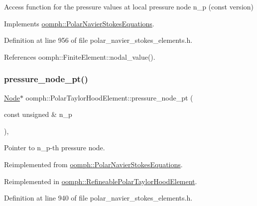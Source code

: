 Access function for the pressure values at local pressure node n\+\_\+p (const version) 



Implements \hyperlink{classoomph_1_1PolarNavierStokesEquations_a4db8f8149fe830b204de3c5f64fd3113}{oomph\+::\+Polar\+Navier\+Stokes\+Equations}.



Definition at line 956 of file polar\+\_\+navier\+\_\+stokes\+\_\+elements.\+h.



References oomph\+::\+Finite\+Element\+::nodal\+\_\+value().

\mbox{\label{classoomph_1_1PolarTaylorHoodElement_a8843c94923e754967be8765c77d8c0a0}} 
\subsubsection{\texorpdfstring{pressure\+\_\+node\+\_\+pt()}{pressure\_node\_pt()}}
{\footnotesize\ttfamily \hyperlink{classoomph_1_1Node}{Node}$\ast$ oomph\+::\+Polar\+Taylor\+Hood\+Element\+::pressure\+\_\+node\+\_\+pt (\begin{DoxyParamCaption}\item[{const unsigned \&}]{n\+\_\+p }\end{DoxyParamCaption})\hspace{0.3cm}{\ttfamily [inline]}, {\ttfamily [virtual]}}



Pointer to n\+\_\+p-\/th pressure node. 



Reimplemented from \hyperlink{classoomph_1_1PolarNavierStokesEquations_ae87e3863f67fb6cceb6b0e74a360febe}{oomph\+::\+Polar\+Navier\+Stokes\+Equations}.



Reimplemented in \hyperlink{classoomph_1_1RefineablePolarTaylorHoodElement_a327a296af13c5c7346fdfd06b4da7bd8}{oomph\+::\+Refineable\+Polar\+Taylor\+Hood\+Element}.



Definition at line 940 of file polar\+\_\+navier\+\_\+stokes\+\_\+elements.\+h.



